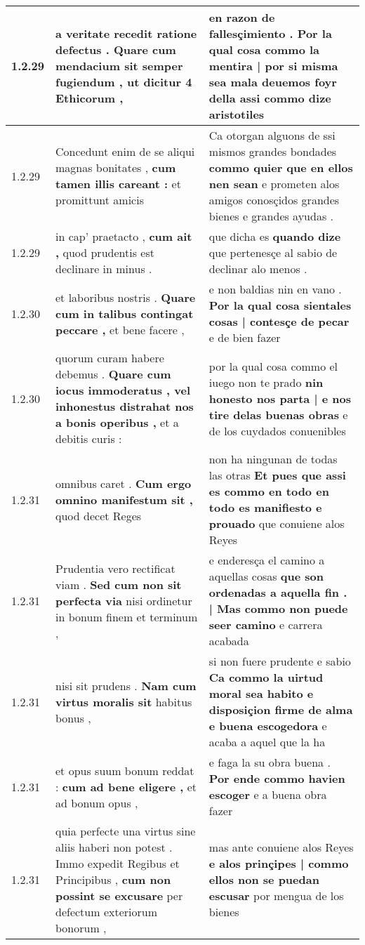 \begin{tabular}{|p{1cm}|p{6.5cm}|p{6.5cm}|}
1.2.29 & a veritate recedit ratione defectus . \textbf{ Quare cum mendacium sit semper fugiendum , } ut dicitur 4 Ethicorum , & en razon de fallesçimiento . \textbf{ Por la qual cosa commo la mentira | por si misma sea mala deuemos foyr della } assi commo dize aristotiles \\\hline
1.2.29 & Concedunt enim de se aliqui magnas bonitates , \textbf{ cum tamen illis careant : } et promittunt amicis & Ca otorgan alguons de ssi mismos grandes bondades \textbf{ commo quier que en ellos nen sean } e prometen alos amigos conosçidos grandes bienes e grandes ayudas . \\\hline
1.2.29 & in cap’ praetacto , \textbf{ cum ait , } quod prudentis est declinare in minus . & que dicha es \textbf{ quando dize } que pertenesçe al sabio de declinar alo menos . \\\hline
1.2.30 & et laboribus nostris . \textbf{ Quare cum in talibus contingat peccare , } et bene facere , & e non baldias nin en vano . \textbf{ Por la qual cosa sientales cosas | contesçe de pecar } e de bien fazer \\\hline
1.2.30 & quorum curam habere debemus . \textbf{ Quare cum iocus immoderatus , vel inhonestus distrahat nos a bonis operibus , } et a debitis curis : & por la qual cosa commo el iuego non te prado \textbf{ nin honesto nos parta | e nos tire delas buenas obras } e de los cuydados conuenibles \\\hline
1.2.31 & omnibus caret . \textbf{ Cum ergo omnino manifestum sit , } quod decet Reges & non ha ningunan de todas las otras \textbf{ Et pues que assi es commo en todo en todo es manifiesto e prouado } que conuiene alos Reyes \\\hline
1.2.31 & Prudentia vero rectificat viam . \textbf{ Sed cum non sit perfecta via } nisi ordinetur in bonum finem et terminum , & e enderesça el camino a aquellas cosas \textbf{ que son ordenadas a aquella fin . | Mas commo non puede seer camino } e carrera acabada \\\hline
1.2.31 & nisi sit prudens . \textbf{ Nam cum virtus moralis sit } habitus bonus , & si non fuere prudente e sabio \textbf{ Ca commo la uirtud moral sea habito e disposiçion firme de alma e buena escogedora } e acaba a aquel que la ha \\\hline
1.2.31 & et opus suum bonum reddat : \textbf{ cum ad bene eligere , } et ad bonum opus , & e faga la su obra buena . \textbf{ Por ende commo havien escoger } e a buena obra fazer \\\hline
1.2.31 & quia perfecte una virtus sine aliis haberi non potest . Immo expedit Regibus et Principibus , \textbf{ cum non possint se excusare } per defectum exteriorum bonorum , & mas ante conuiene alos Reyes \textbf{ e alos prinçipes | commo ellos non se puedan escusar } por mengua de los bienes \\\hline

\end{tabular}
